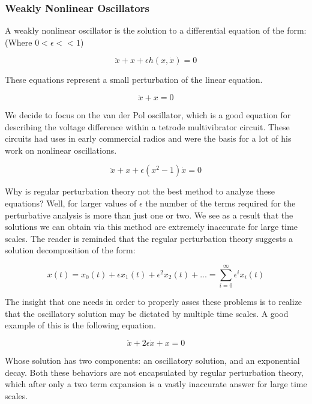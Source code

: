 \documentclass[12pt]{article}
\begin{document}
\subsubsection{Weakly Nonlinear Oscillators}
A weakly nonlinear oscillator is the solution to a differential equation of the form: (Where $0<\epsilon << 1$)

\begin{equation}
\ddot{x} + x + \epsilon h(x, \dot{x}) = 0
\end{equation}

These equations represent a small perturbation of the linear equation. 

\begin{equation}
\ddot{x} + x = 0
\end{equation}

We decide to focus on the van der Pol oscillator, which is a good equation for describing the voltage difference within a tetrode multivibrator circuit.  These circuits had uses in early commercial radios and were the basis for a lot of his work on nonlinear oscillations. 

\begin{equation}
\ddot{x} + x + \epsilon (x^2 -1)\dot{x} = 0
\end{equation}

Why is regular perturbation theory not the best method to analyze these equations?  Well, for larger values of $\epsilon$ the number of the terms required for the perturbative analysis is more than just one or two.  We see as a result that the solutions we can obtain via this method are extremely inaccurate for large time scales.  The reader is reminded that the regular perturbation theory suggests a solution decomposition of the form:

\begin{equation}
x(t) = x_0(t) + \epsilon x_1(t) + \epsilon^2 x_2(t) + ... = \sum_{i=0}^{\infty} \epsilon^i x_i(t)
\end{equation}

The insight that one needs in order to properly asses these problems is to realize that the oscillatory solution may be dictated by multiple time scales.  A good example of this is the following equation.

\begin{equation}
\ddot{x} + 2 \epsilon \dot{x}+ x  = 0
\end{equation}

Whose solution has two components: an oscillatory solution, and an exponential decay.  Both these behaviors are not encapsulated by regular perturbation theory, which after only a two term expansion is a vastly inaccurate answer for large time scales.  
\end{document}
